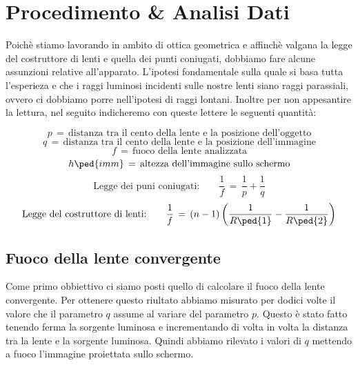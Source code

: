 \section{Procedimento \& Analisi Dati}

Poichè stiamo lavorando in ambito di ottica geometrica e affinchè valgana la legge del costruttore di lenti e quella dei punti coniugati, dobbiamo fare alcune assunzioni relative all'apparato.
L'ipotesi fondamentale sulla quale si basa tutta l'esperieza e che i raggi luminosi incidenti sulle nostre lenti siano raggi parassiali, ovvero ci dobbiamo porre nell'ipotesi di raggi lontani.
Inoltre per non appesantire la lettura, nel seguito indicheremo con queste lettere le seguenti quantità:


\begin{equation*}
	p \,=\, \text{distanza tra il cento della lente e la posizione dell'oggetto}
\end{equation*}
\begin{equation*}
	q \,=\, \text{distanza tra il cento della lente e la posizione dell'immagine}
\end{equation*}
\begin{equation*}
	f \,=\, \text{fuoco della lente analizzata}
\end{equation*}
\begin{equation*}
	h \ped{imm} \,=\, \text{altezza dell'immagine sullo schermo}
\end{equation*}
\begin{equation}
	\text{Legge dei puni coniugati:} \qquad \frac{1}{f} \,=\, \frac{1}{p} + \frac{1}{q}
	\label{coniugati}
\end{equation}
\begin{equation}
	\text{Legge del costruttore di lenti:} \qquad \frac{1}{f} \,=\, (n-1)\left(\frac{1}{R\ped{1}}-\frac{1}{R\ped{2}}\right)
	\label{costruttore}
\end{equation}


\subsection{Fuoco della lente convergente}

Come primo obbiettivo ci siamo posti quello di calcolare il fuoco della lente convergente. Per ottenere questo riultato abbiamo misurato per dodici volte il valore che il parametro $q$ assume al variare del parametro $p$. Questo è stato fatto tenendo ferma la sorgente luminosa e incrementando di volta in volta la distanza tra la lente e la sorgente luminosa. Quindi abbiamo rilevato i valori di $q$ mettendo a fuoco l'immagine proiettata sullo schermo.

